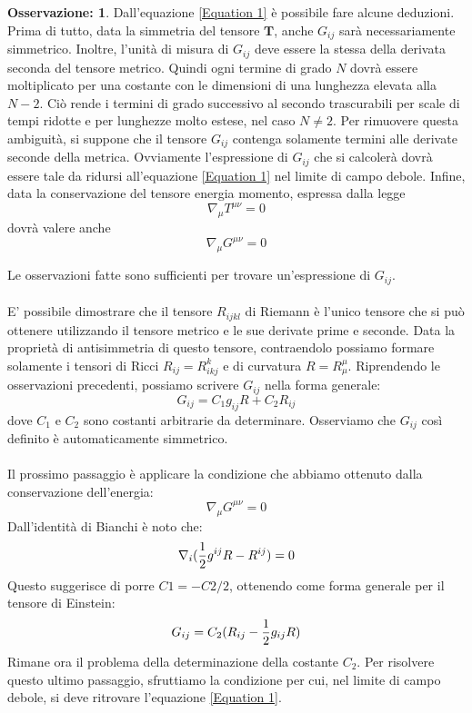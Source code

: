 \documentclass[]{report}
\theoremstyle{definition}
\theoremstyle{Theorem}
\theoremstyle{definition}
\theoremstyle{definition}
\theoremstyle{definition}
\newtheorem{Obs}[Def]{Osservazione:}
\begin{document}
\begin{Obs}
	Dall'equazione \ref{Equation 1} è possibile fare alcune deduzioni. Prima di tutto, data la simmetria del tensore $\textbf{T}$, anche $G_{ij}$ sarà necessariamente simmetrico. Inoltre, l'unità di misura di $G_{ij}$ deve essere la stessa della derivata seconda del tensore metrico. Quindi ogni termine di grado $N$ dovrà essere moltiplicato per una costante con le dimensioni di una lunghezza elevata alla $N-2$. Ciò rende i termini di grado successivo al secondo trascurabili per scale di tempi ridotte e per lunghezze molto estese, nel caso $N\neq 2$.
	Per rimuovere questa ambiguità, si suppone che il tensore $G_{ij}$ contenga solamente termini alle derivate seconde della metrica. Ovviamente l'espressione di $G_{ij}$ che si calcolerà dovrà essere tale da ridursi all'equazione \ref{Equation 1} nel limite di campo debole.
	Infine, data la conservazione del tensore energia momento, espressa dalla legge 
	$$\nabla_\mu T^{\mu\nu}=0$$
	dovrà valere anche 
	$$\nabla_\mu G^{\mu\nu}=0$$
\end{Obs}
Le osservazioni fatte sono sufficienti per trovare un'espressione di $G_{ij}$.\\
\\
E' possibile dimostrare che il tensore $R_{ijkl}$ di Riemann è l'unico tensore che si può ottenere utilizzando il tensore metrico e le sue derivate prime e seconde. Data la proprietà di antisimmetria di questo tensore, contraendolo possiamo formare solamente i tensori di Ricci $R_{ij}=R^k_{ikj}$ e di curvatura $R=R^\mu_\mu$. Riprendendo le osservazioni precedenti, possiamo scrivere $G_{ij}$ nella forma generale:
$$G_{ij}=C_1g_{ij}R+C_2R_{ij}$$
dove $C_1$ e $C_2$ sono costanti arbitrarie da determinare.
Osserviamo che $G_{ij}$ così definito è automaticamente simmetrico.\\
\\
Il prossimo passaggio è applicare la condizione che abbiamo ottenuto dalla conservazione dell'energia: $$\nabla_\mu G^{\mu\nu}=0$$
Dall'identità di Bianchi è noto che:
$$\nabla_i({1\over 2}g^{ij}R-R^{ij})=0$$
Questo suggerisce di porre $C1=-C2/2$, ottenendo come forma generale per il tensore di Einstein:
\begin{equation}
	\label{Equation 2}
	G_{ij}=C_2(R_{ij}-{1\over 2}g_{ij}R)
\end{equation}
Rimane ora il problema della determinazione della costante $C_2$. Per risolvere questo ultimo passaggio, sfruttiamo la condizione per cui, nel limite di campo debole, si deve ritrovare l'equazione \ref{Equation 1}.\\
\end{document}
